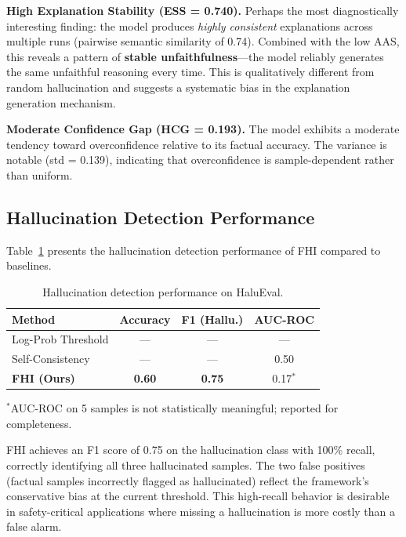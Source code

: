 \textbf{High Explanation Stability (ESS = 0.740).} Perhaps the most diagnostically interesting finding: the model produces \textit{highly consistent} explanations across multiple runs (pairwise semantic similarity of 0.74). Combined with the low AAS, this reveals a pattern of \textbf{stable unfaithfulness}---the model reliably generates the same unfaithful reasoning every time. This is qualitatively different from random hallucination and suggests a systematic bias in the explanation generation mechanism.

\textbf{Moderate Confidence Gap (HCG = 0.193).} The model exhibits a moderate tendency toward overconfidence relative to its factual accuracy. The variance is notable (std = 0.139), indicating that overconfidence is sample-dependent rather than uniform.

\subsection{Hallucination Detection Performance}

Table~\ref{tab:detection} presents the hallucination detection performance of FHI compared to baselines.

\begin{table}[h]
\centering
\caption{Hallucination detection performance on HaluEval.}
\label{tab:detection}
\begin{tabular}{lccc}
\toprule
\textbf{Method} & \textbf{Accuracy} & \textbf{F1 (Hallu.)} & \textbf{AUC-ROC} \\
\midrule
Log-Prob Threshold & --- & --- & --- \\
Self-Consistency & --- & --- & 0.50 \\
\textbf{FHI (Ours)} & \textbf{0.60} & \textbf{0.75} & 0.17$^*$ \\
\bottomrule
\end{tabular}
\vspace{2mm}
\footnotesize{$^*$AUC-ROC on 5 samples is not statistically meaningful; reported for completeness.}
\end{table}

FHI achieves an F1 score of 0.75 on the hallucination class with 100\% recall, correctly identifying all three hallucinated samples. The two false positives (factual samples incorrectly flagged as hallucinated) reflect the framework's conservative bias at the current threshold. This high-recall behavior is desirable in safety-critical applications where missing a hallucination is more costly than a false alarm.

